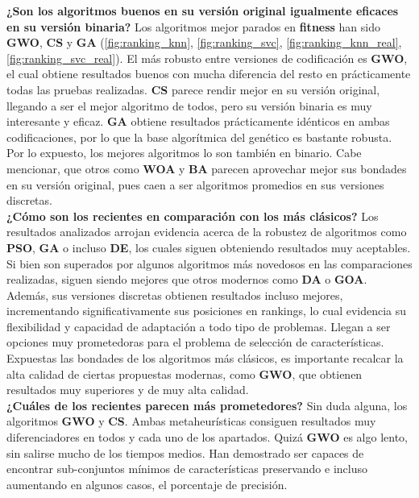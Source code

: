 \textbf{¿Son los algoritmos buenos en su versión original igualmente eficaces en su versión binaria?} Los algoritmos mejor parados en \textbf{fitness} han sido \textbf{GWO}, \textbf{CS} y \textbf{GA} (\ref{fig:ranking_knn}, \ref{fig:ranking_svc}, \ref{fig:ranking_knn_real}, \ref{fig:ranking_svc_real}). El más robusto entre versiones de codificación es \textbf{GWO}, el cual obtiene resultados buenos con mucha diferencia del resto en prácticamente todas las pruebas realizadas. \textbf{CS} parece rendir mejor en su versión original, llegando a ser el mejor algoritmo de todos, pero su versión binaria es muy interesante y eficaz. \textbf{GA} obtiene resultados prácticamente idénticos en ambas codificaciones, por lo que la base algorítmica del genético es bastante robusta.\\[6pt]
Por lo expuesto, los mejores algoritmos lo son también en binario. Cabe mencionar, que otros como \textbf{WOA} y \textbf{BA} parecen aprovechar mejor sus bondades en su versión original, pues caen a ser algoritmos promedios en sus versiones discretas.\\[6pt]
\textbf{¿Cómo son los recientes en comparación con los más clásicos?} Los resultados analizados arrojan evidencia acerca de la robustez de algoritmos como \textbf{PSO}, \textbf{GA} o incluso \textbf{DE}, los cuales siguen obteniendo resultados muy aceptables. Si bien son superados por algunos algoritmos más novedosos en las comparaciones realizadas, siguen siendo mejores que otros modernos como \textbf{DA} o \textbf{GOA}.\\[6pt]
Además, sus versiones discretas obtienen resultados incluso mejores, incrementando significativamente sus posiciones en rankings, lo cual evidencia su flexibilidad y capacidad de adaptación a todo tipo de problemas. Llegan a ser opciones muy prometedoras para el problema de selección de características.\\[6pt]
Expuestas las bondades de los algoritmos más clásicos, es importante recalcar la alta calidad de ciertas propuestas modernas, como \textbf{GWO}, que obtienen resultados muy superiores y de muy alta calidad.\\[6pt]
\textbf{¿Cuáles de los recientes parecen más prometedores?} Sin duda alguna, los algoritmos \textbf{GWO} y \textbf{CS}. Ambas metaheurísticas consiguen resultados muy diferenciadores en todos y cada uno de los apartados. Quizá \textbf{GWO} es algo lento, sin salirse mucho de los tiempos medios. Han demostrado ser capaces de encontrar sub-conjuntos mínimos de características preservando e incluso aumentando en algunos casos, el porcentaje de precisión.\\[6pt]

